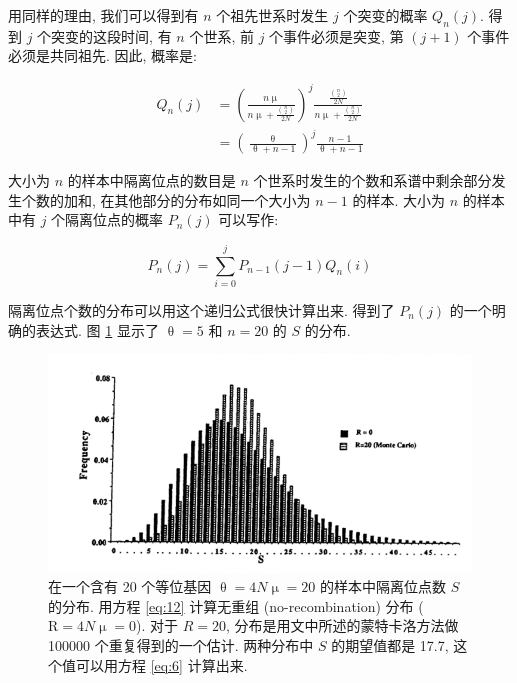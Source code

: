 \documentclass[12pt]{article}
\begin{document}
用同样的理由, 我们可以得到有 $n$ 个祖先世系时发生 $j$ 个突变的概率 $Q_{n}(j)$. 得到 $j$ 个突变的这段时间, 有 $n$
个世系, 前 $j$ 个事件必须是突变, 第 $(j+1)$ 个事件必须是共同祖先. 因此, 概率是:

\begin{equation} \label{eq:11}
    \begin{split}
        Q_{n}(j) & = \left (\frac{n\upmu}{n\upmu + \frac{\binom{n}{2}}{2N}} \right )^{j} \frac{\frac{\binom{n}{2}}{2N}}{n\upmu + \frac{\binom{n}{2}}{2N}} \\
        & = \left (\frac{\uptheta}{\uptheta + n - 1} \right )^{j} \frac{n-1}{\uptheta + n - 1}
    \end{split}
\end{equation}

大小为 $n$ 的样本中隔离位点的数目是 $n$ 个世系时发生的个数和系谱中剩余部分发生个数的加和, 在其他部分的分布如同一个大小为
$n-1$ 的样本. 大小为 $n$ 的样本中有 $j$ 个隔离位点的概率 $P_{n}(j)$ 可以写作:

\begin{equation} \label{eq:12}
    P_{n}(j) = \sum_{i=0}^{j} P_{n-1}(j-1) Q_{n}(i)
\end{equation}

隔离位点个数的分布可以用这个递归公式很快计算出来. \textcite{tavare1984} 得到了 $P_{n}(j)$ 的一个明确的表达式. 图
\ref{fig:2} 显示了 $\uptheta=5$ 和 $n=20$ 的 $S$ 的分布.

\begin{figure}
    \centering
    \includegraphics{coalescent-process.images/image2.png}
    \caption{在一个含有 20 个等位基因 $\uptheta = 4N\upmu = 20$ 的样本中隔离位点数 $S$ 的分布.
        用方程 \ref{eq:12} 计算无重组 (no-recombination) 分布 ($\mathrm{R}=4N\upmu =0$).
        对于 $R=20$, 分布是用文中所述的蒙特卡洛方法做 100000 个重复得到的一个估计.
        两种分布中 $S$ 的期望值都是 17.7, 这个值可以用方程 \ref{eq:6} 计算出来.}
    \label{fig:2}
\end{figure}
\end{document}
